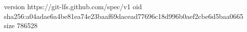 version https://git-lfs.github.com/spec/v1
oid sha256:a04adae6a4be81ea74e23baaf69dacead77696c18d996b0aef2cbe6d5baa0665
size 786528
